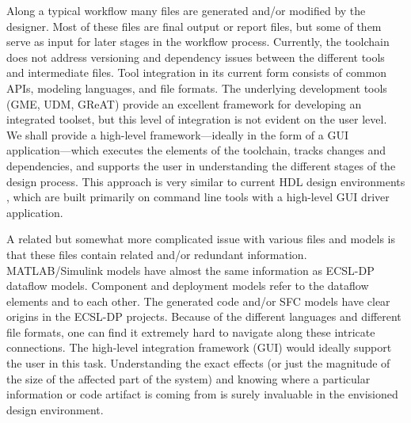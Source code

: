 Along a typical workflow many files are generated and/or modified by
the designer. Most of these files are final output or report files,
but some of them serve as input for later stages in the workflow
process. Currently, the toolchain does not address versioning and
dependency issues between the different tools and intermediate
files. Tool integration in its current form consists of common APIs,
modeling languages, and file formats. The underlying development
tools (GME, UDM, GReAT) provide an excellent framework for
developing an integrated toolset, but this level of integration is
not evident on the user level. We shall provide a high-level
framework---ideally in the form of a GUI application---which executes
the elements of the toolchain, tracks changes and dependencies, and
supports the user in understanding the different stages of the
design process. This approach is very similar to current HDL design
environments \cite{xilinx:ise}\cite{altera:quartus}, which are built
primarily on command line tools with a high-level GUI driver
application.

A related but somewhat more complicated issue with various files and
models is that these files contain related and/or
redundant information. MATLAB/Simulink models have almost the same
information as ECSL-DP dataflow models. Component and deployment
models refer to the dataflow elements and to each other. The
generated code and/or SFC models have clear origins in the ECSL-DP
projects. Because of the different languages and different file
formats, one can find it extremely hard to navigate along these
intricate connections. The high-level integration framework (GUI)
would ideally support the user in this task. Understanding the exact effects (or just the magnitude of
the size of the affected part of the system) and knowing where a
particular information or code artifact is coming from is surely
invaluable in the envisioned design environment.
